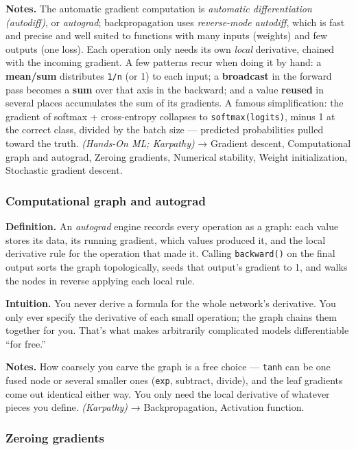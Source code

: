 \documentclass[
  10pt,
  letterpaper,
  onecolumn]{article}
\begin{document}
\textbf{Notes.} The automatic gradient computation is \emph{automatic
differentiation (autodiff)}, or \emph{autograd}; backpropagation uses
\emph{reverse-mode autodiff}, which is fast and precise and well suited
to functions with many inputs (weights) and few outputs (one loss). Each
operation only needs its own \emph{local} derivative, chained with the
incoming gradient. A few patterns recur when doing it by hand: a
\textbf{mean/sum} distributes \texttt{1/n} (or 1) to each input; a
\textbf{broadcast} in the forward pass becomes a \textbf{sum} over that
axis in the backward; and a value \textbf{reused} in several places
accumulates the sum of its gradients. A famous simplification: the
gradient of softmax + cross-entropy collapses to
\texttt{softmax(logits)}, minus 1 at the correct class, divided by the
batch size --- predicted probabilities pulled toward the truth.
\emph{(Hands-On ML; Karpathy)} → Gradient descent, Computational graph
and autograd, Zeroing gradients, Numerical stability, Weight
initialization, Stochastic gradient descent.

\hypertarget{computational-graph-and-autograd}{%
\subsubsection{Computational graph and
autograd}\label{computational-graph-and-autograd}}

\textbf{Definition.} An \emph{autograd} engine records every operation
as a graph: each value stores its data, its running gradient, which
values produced it, and the local derivative rule for the operation that
made it. Calling \texttt{backward()} on the final output sorts the graph
topologically, seeds that output's gradient to 1, and walks the nodes in
reverse applying each local rule.

\textbf{Intuition.} You never derive a formula for the whole network's
derivative. You only ever specify the derivative of each small
operation; the graph chains them together for you. That's what makes
arbitrarily complicated models differentiable ``for free.''

\textbf{Notes.} How coarsely you carve the graph is a free choice ---
\texttt{tanh} can be one fused node or several smaller ones
(\texttt{exp}, subtract, divide), and the leaf gradients come out
identical either way. You only need the local derivative of whatever
pieces you define. \emph{(Karpathy)} → Backpropagation, Activation
function.

\hypertarget{zeroing-gradients}{%
\subsubsection{Zeroing gradients}\label{zeroing-gradients}}
\end{document}

